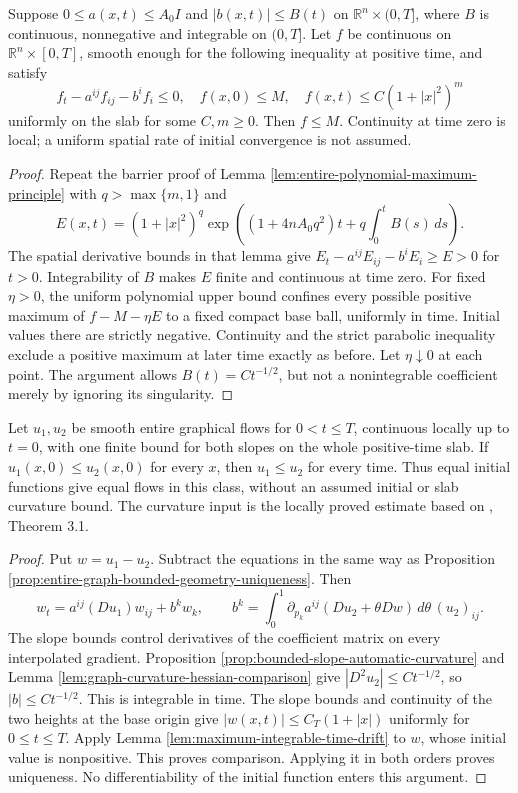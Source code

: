 \begin{lemma}\label{lem:maximum-integrable-time-drift}
Suppose $0\leq a(x,t)\leq A_0I$ and $|b(x,t)|\leq B(t)$ on $\mathbb R^n\times(0,T]$, where $B$ is continuous, nonnegative and integrable on $(0,T]$. Let $f$ be continuous on $\mathbb R^n\times[0,T]$, smooth enough for the following inequality at positive time, and satisfy
\[
 f_t-a^{ij}f_{ij}-b^if_i\leq0,\quad f(x,0)\leq M,
 \quad f(x,t)\leq C(1+|x|^2)^m
\]
uniformly on the slab for some $C,m\geq0$. Then $f\leq M$. Continuity at time zero is local; a uniform spatial rate of initial convergence is not assumed.
\end{lemma}
\begin{proof}
Repeat the barrier proof of Lemma \ref{lem:entire-polynomial-maximum-principle} with $q>\max\{m,1\}$ and
\[
 E(x,t)=(1+|x|^2)^q
 \exp\left((1+4nA_0q^2)t+q\int_0^t B(s)\,ds\right).
\]
The spatial derivative bounds in that lemma give $E_t-a^{ij}E_{ij}-b^iE_i\geq E>0$ for $t>0$. Integrability of $B$ makes $E$ finite and continuous at time zero. For fixed $\eta>0$, the uniform polynomial upper bound confines every possible positive maximum of $f-M-\eta E$ to a fixed compact base ball, uniformly in time. Initial values there are strictly negative. Continuity and the strict parabolic inequality exclude a positive maximum at later time exactly as before. Let $\eta\downarrow0$ at each point. The argument allows $B(t)=Ct^{-1/2}$, but not a nonintegrable coefficient merely by ignoring its singularity.
\end{proof}

\begin{theorem}\label{thm:entire-bounded-slope-comparison}
Let $u_1,u_2$ be smooth entire graphical flows for $0<t\leq T$, continuous locally up to $t=0$, with one finite bound for both slopes on the whole positive-time slab. If $u_1(x,0)\leq u_2(x,0)$ for every $x$, then $u_1\leq u_2$ for every time. Thus equal initial functions give equal flows in this class, without an assumed initial or slab curvature bound. The curvature input is the locally proved estimate based on \cite{EH91}, Theorem 3.1.
\end{theorem}
\begin{proof}
Put $w=u_1-u_2$. Subtract the equations in the same way as Proposition \ref{prop:entire-graph-bounded-geometry-uniqueness}. Then
\[
 w_t=a^{ij}(Du_1)w_{ij}+b^kw_k,
 \qquad
 b^k=\int_0^1\partial_{p_k}a^{ij}(Du_2+\theta Dw)\,d\theta\,(u_2)_{ij}.
\]
The slope bounds control derivatives of the coefficient matrix on every interpolated gradient. Proposition \ref{prop:bounded-slope-automatic-curvature} and Lemma \ref{lem:graph-curvature-hessian-comparison} give $|D^2u_2|\leq C t^{-1/2}$, so $|b|\leq C t^{-1/2}$. This is integrable in time. The slope bounds and continuity of the two heights at the base origin give $|w(x,t)|\leq C_T(1+|x|)$ uniformly for $0\leq t\leq T$. Apply Lemma \ref{lem:maximum-integrable-time-drift} to $w$, whose initial value is nonpositive. This proves comparison. Applying it in both orders proves uniqueness. No differentiability of the initial function enters this argument.
\end{proof}

